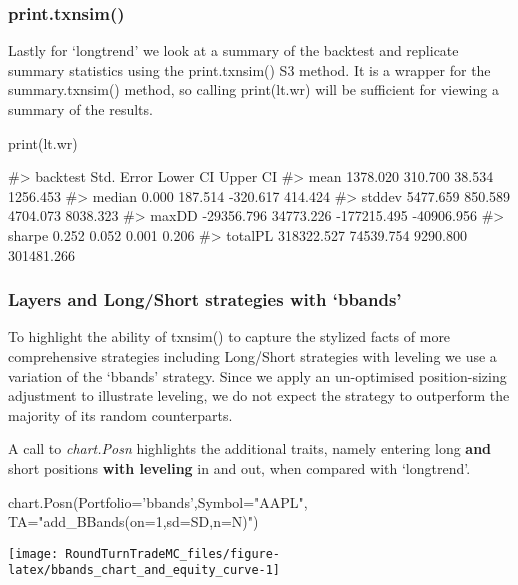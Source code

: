 \hypertarget{print.txnsim}{%
\subsubsection{print.txnsim()}\label{print.txnsim}}

Lastly for `longtrend' we look at a summary of the backtest and
replicate summary statistics using the print.txnsim() S3 method. It is a
wrapper for the summary.txnsim() method, so calling print(lt.wr) will be
sufficient for viewing a summary of the results.

\begin{Schunk}
\begin{Sinput}
print(lt.wr)
\end{Sinput}
\begin{Soutput}
#>           backtest Std. Error    Lower CI   Upper CI
#> mean      1378.020    310.700      38.534   1256.453
#> median       0.000    187.514    -320.617    414.424
#> stddev    5477.659    850.589    4704.073   8038.323
#> maxDD   -29356.796  34773.226 -177215.495 -40906.956
#> sharpe       0.252      0.052       0.001      0.206
#> totalPL 318322.527  74539.754    9290.800 301481.266
\end{Soutput}
\end{Schunk}

\hypertarget{layers-and-longshort-strategies-with-bbands}{%
\subsubsection{Layers and Long/Short strategies with
`bbands'}\label{layers-and-longshort-strategies-with-bbands}}

To highlight the ability of txnsim() to capture the stylized facts of
more comprehensive strategies including Long/Short strategies with
leveling we use a variation of the `bbands' strategy. Since we apply an
un-optimised position-sizing adjustment to illustrate leveling, we do
not expect the strategy to outperform the majority of its random
counterparts.

A call to \emph{chart.Posn} highlights the additional traits, namely
entering long \textbf{and} short positions \textbf{with leveling} in and
out, when compared with `longtrend'.

\begin{Schunk}
\begin{Sinput}
chart.Posn(Portfolio='bbands',Symbol="AAPL",
           TA="add_BBands(on=1,sd=SD,n=N)")
\end{Sinput}


\begin{center}\texttt{[image: RoundTurnTradeMC\_files/figure-latex/bbands\_chart\_and\_equity\_curve-1]} \end{center}

\end{Schunk}

